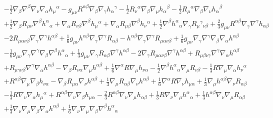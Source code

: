 \documentclass[10pt,letterpaper]{article}
\numberwithin{equation}{section}
\begin{document}
\begin{align}
& -  \tfrac{1}{2} \nabla_{\beta}\nabla^{\beta}\nabla_{\nu}\nabla_{\alpha}h_{\mu}{}^{\alpha} -  g_{\mu \nu} R^{\alpha \beta} \nabla_{\beta}\nabla_{\gamma}h_{\alpha}{}^{\gamma} -  \tfrac{1}{2} R_{\nu}{}^{\alpha} \nabla_{\beta}\nabla_{\mu}h_{\alpha}{}^{\beta} -  \tfrac{1}{2} R_{\mu}{}^{\alpha} \nabla_{\beta}\nabla_{\nu}h_{\alpha}{}^{\beta} \nonumber \\
&+ \tfrac{1}{2} \nabla_{\beta}R_{\mu \nu} \nabla^{\beta}h^{\alpha}{}_{\alpha} + \nabla_{\alpha}R_{\nu \beta} \nabla^{\beta}h_{\mu}{}^{\alpha} + \nabla_{\alpha}R_{\mu \beta} \nabla^{\beta}h_{\nu}{}^{\alpha} + \tfrac{1}{2} \nabla^{\beta}h^{\alpha}{}_{\alpha} \nabla_{\gamma}R_{\mu}{}^{\gamma}{}_{\nu \beta} + \tfrac{2}{3} g_{\mu \nu} R^{\alpha \beta} \nabla_{\gamma}\nabla^{\gamma}h_{\alpha \beta}\nonumber \\
&- 2 R_{\mu \alpha \nu \beta} \nabla_{\gamma}\nabla^{\gamma}h^{\alpha \beta} + \tfrac{1}{6} g_{\mu \nu} h^{\alpha \beta} \nabla_{\gamma}\nabla^{\gamma}R_{\alpha \beta} -  h^{\alpha \beta} \nabla_{\gamma}\nabla^{\gamma}R_{\mu \alpha \nu \beta} + \tfrac{1}{6} g_{\mu \nu} \nabla_{\gamma}\nabla^{\gamma}\nabla_{\beta}\nabla_{\alpha}h^{\alpha \beta}\nonumber \\
& -  \tfrac{1}{6} g_{\mu \nu} \nabla_{\gamma}\nabla^{\gamma}\nabla_{\beta}\nabla^{\beta}h^{\alpha}{}_{\alpha} + \tfrac{1}{3} g_{\mu \nu} \nabla_{\gamma}R_{\alpha \beta} \nabla^{\gamma}h^{\alpha \beta} - 2 \nabla_{\gamma}R_{\mu \alpha \nu \beta} \nabla^{\gamma}h^{\alpha \beta} + R_{\mu \beta \nu \gamma} \nabla^{\gamma}\nabla_{\alpha}h^{\alpha \beta}\nonumber \\
& + R_{\mu \gamma \nu \beta} \nabla^{\gamma}\nabla_{\alpha}h^{\alpha \beta} -  \nabla_{\beta}R_{\nu \alpha} \nabla_{\mu}h^{\alpha \beta} + \tfrac{1}{6} \nabla^{\alpha}R \nabla_{\mu}h_{\nu \alpha} -  \tfrac{1}{2} \nabla^{\beta}h^{\alpha}{}_{\alpha} \nabla_{\mu}R_{\nu \beta} -  \tfrac{1}{3} R \nabla_{\mu}\nabla_{\alpha}h_{\nu}{}^{\alpha} \nonumber \\
&+ R^{\alpha \beta} \nabla_{\mu}\nabla_{\beta}h_{\nu \alpha} -  \nabla_{\beta}R_{\mu \alpha} \nabla_{\nu}h^{\alpha \beta} + \tfrac{1}{3} \nabla_{\mu}R_{\alpha \beta} \nabla_{\nu}h^{\alpha \beta} + \tfrac{1}{6} \nabla^{\alpha}R \nabla_{\nu}h_{\mu \alpha} + \tfrac{1}{3} \nabla_{\mu}h^{\alpha \beta} \nabla_{\nu}R_{\alpha \beta}\nonumber \\
& -  \tfrac{1}{3} R \nabla_{\nu}\nabla_{\alpha}h_{\mu}{}^{\alpha} + R^{\alpha \beta} \nabla_{\nu}\nabla_{\beta}h_{\mu \alpha} -  \tfrac{2}{3} R^{\alpha \beta} \nabla_{\nu}\nabla_{\mu}h_{\alpha \beta} + \tfrac{1}{3} R \nabla_{\nu}\nabla_{\mu}h^{\alpha}{}_{\alpha} + \tfrac{1}{3} h^{\alpha \beta} \nabla_{\nu}\nabla_{\mu}R_{\alpha \beta} \nonumber \\
&+ \tfrac{1}{3} \nabla_{\nu}\nabla_{\mu}\nabla_{\beta}\nabla_{\alpha}h^{\alpha \beta} + \tfrac{1}{6} \nabla_{\nu}\nabla_{\mu}\nabla_{\beta}\nabla^{\beta}h^{\alpha}{}_{\alpha} \nonumber
\end{align} 
\\ \\ 
\end{document}
